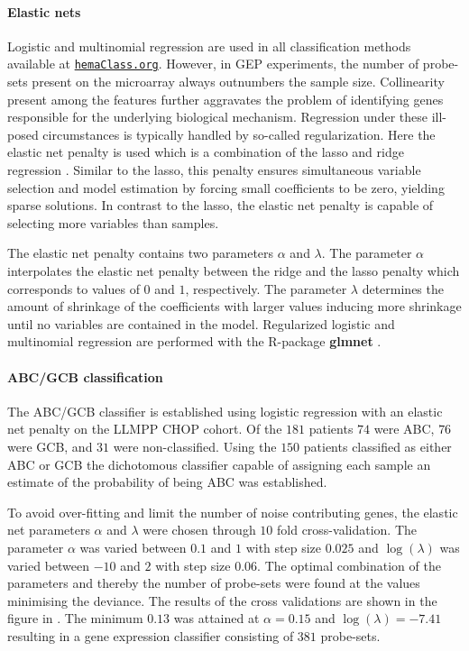 \documentclass[10pt,letterpaper]{article}
\newcommand{\hemaClass}{\href{http://hemaClass.org}{\texttt{hemaClass.org}}}
\newcommand{\R}{\textsf{R}}
\newcommand{\pkg}[1]{\textbf{#1}}
\begin{document}
\paragraph{Elastic nets}
Logistic and multinomial regression are used in all classification methods available at \hemaClass{}.
However, in GEP experiments, the number of probe-sets present on the microarray always outnumbers the sample size.
Collinearity present among the features further aggravates the problem of identifying genes responsible for the underlying biological mechanism.
Regression under these ill-posed circumstances is typically handled by so-called regularization.
Here the elastic net penalty \cite{Friedman2010, Zou2005} is used which is a combination of the lasso \cite{Tibshirani1996} and ridge regression \cite{Hoerl1970}.
Similar to the lasso, this penalty ensures simultaneous variable selection and model estimation by forcing small coefficients to be zero, yielding sparse solutions.
In contrast to the lasso, the elastic net penalty is capable of selecting more variables than samples.

The elastic net penalty contains two parameters $\alpha$ and $\lambda$.
The parameter $\alpha$ interpolates the elastic net penalty between the ridge and the lasso penalty which corresponds to values of $0$ and $1$, respectively.
The parameter $\lambda$ determines the amount of shrinkage of the coefficients with larger values inducing more shrinkage until no variables are contained in the model.
Regularized logistic and multinomial regression are performed with the \R{}-package \pkg{glmnet} \cite{Friedman2010}.

\paragraph{ABC/GCB classification}
The ABC/GCB classifier is established using logistic regression with an elastic net penalty on the LLMPP CHOP cohort.
Of the $181$ patients $74$ were ABC, $76$ were GCB, and $31$ were non-classified.
Using the $150$ patients classified as either ABC or GCB the dichotomous classifier capable of assigning each sample an estimate of the probability of being ABC was established.

To avoid over-fitting and limit the number of noise contributing genes, the elastic net parameters $\alpha$ and $\lambda$ were chosen through $10$ fold cross-validation.
The parameter $\alpha$ was varied between $0.1$ and $1$ with step size $0.025$ and $\log(\lambda)$ was varied between $-10$ and $2$ with step size $0.06$.
The optimal combination of the parameters and thereby the number of probe-sets were found at the values minimising the deviance.
The results of the cross validations are shown in the figure in .
The minimum $0.13$ was attained at $\alpha = 0.15$ and $\log(\lambda) = -7.41$ resulting in a gene expression classifier consisting of $381$ probe-sets.
\end{document}
